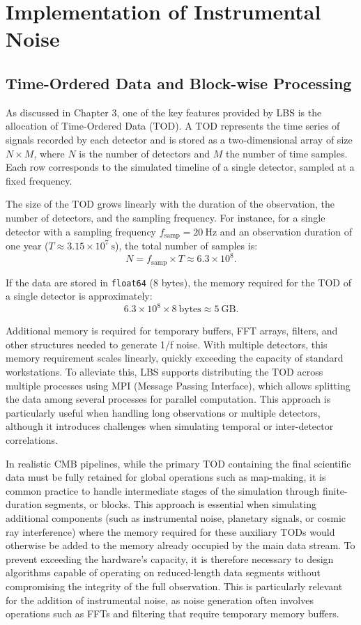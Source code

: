 \chapter{Implementation of Instrumental Noise}

\section{Time-Ordered Data and Block-wise Processing}

As discussed in Chapter 3, one of the key features provided by LBS is the allocation of Time-Ordered Data (TOD). A TOD represents the time series of signals recorded by each detector and is stored as a two-dimensional array of size \(N \times M\), where \(N\) is the number of detectors and \(M\) the number of time samples. Each row corresponds to the simulated timeline of a single detector, sampled at a fixed frequency.

The size of the TOD grows linearly with the duration of the observation, the number of detectors, and the sampling frequency. For instance, for a single detector with a sampling frequency \(f_\text{samp} = 20 \ \text{Hz}\) and an observation duration of one year (\(T \approx 3.15 \times 10^7 \ \text{s}\)), the total number of samples is:
\[
N = f_\text{samp} \times T \approx 6.3 \times 10^8.
\]

If the data are stored in \texttt{float64} (8 bytes), the memory required for the TOD of a single detector is approximately:
\[
6.3 \times 10^8 \times 8 \ \text{bytes} \approx 5 \ \text{GB}.
\]

Additional memory is required for temporary buffers, FFT arrays, filters, and other structures needed to generate 1/f noise. With multiple detectors, this memory requirement scales linearly, quickly exceeding the capacity of standard workstations. To alleviate this, LBS supports distributing the TOD across multiple processes using MPI (Message Passing Interface), which allows splitting the data among several processes for parallel computation. This approach is particularly useful when handling long observations or multiple detectors, although it introduces challenges when simulating temporal or inter-detector correlations.

In realistic CMB pipelines, while the primary TOD containing the final scientific data must be fully retained for global operations such as map-making, it is common practice to handle intermediate stages of the simulation through finite-duration segments, or blocks. This approach is essential when simulating additional components (such as instrumental noise, planetary signals, or cosmic ray interference) where the memory required for these auxiliary TODs would otherwise be added to the memory already occupied by the main data stream. To prevent exceeding the hardware's capacity, it is therefore necessary to design algorithms capable of operating on reduced-length data segments without compromising the integrity of the full observation.
This is particularly relevant for the addition of instrumental noise, as noise generation often involves operations such as FFTs and filtering that require temporary memory buffers.



